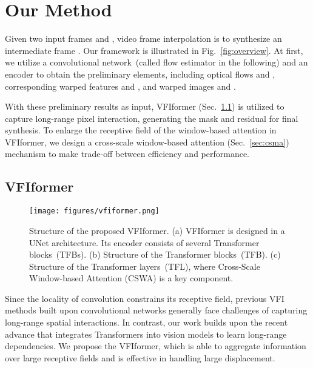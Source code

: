 \documentclass[10pt,twocolumn,letterpaper]{article}
\begin{document}
	


	
	
	\section{Our Method}
	
	
	Given two input frames  and , video frame interpolation is to synthesize an intermediate frame . Our framework is illustrated in Fig.~\ref{fig:overview}. At first, we utilize a convolutional network~(called flow estimator in the following) and an encoder  to obtain the preliminary elements, including optical flows  and , corresponding warped features  and , and warped images  and . 
	
	With these preliminary results as input, VFIformer (Sec.~\ref{sec:vfiformer}) is utilized to capture long-range pixel interaction, generating the mask and residual for final synthesis. To enlarge the receptive field of the window-based attention in VFIformer, we design a cross-scale window-based attention (Sec.~\ref{sec:csma}) mechanism to make trade-off between efficiency and performance.
	
	
	
	\subsection{VFIformer}
	\label{sec:vfiformer}
	
	\begin{figure*}[t]
		\begin{center}
			\texttt{[image: figures/vfiformer.png]}
		\end{center}
\caption{Structure of the proposed VFIformer. (a) VFIformer is designed in a UNet architecture. Its encoder consists of several Transformer blocks~(TFBs). (b) Structure of the Transformer blocks~(TFB). (c) Structure of the Transformer layers~(TFL), where Cross-Scale Window-based Attention (CSWA) is a key component.}
		\label{fig:fe_transformer}
		\vspace{-0.1in}
	\end{figure*}
	
	
	Since the locality of convolution constrains its receptive field, previous VFI methods built upon convolutional networks generally face challenges of capturing long-range spatial interactions. In contrast, our work builds upon the recent advance that integrates Transformers into vision models to learn long-range dependencies. We propose the VFIformer, which is able to aggregate information over large receptive fields and is effective in handling large  displacement.
	
\end{document}
